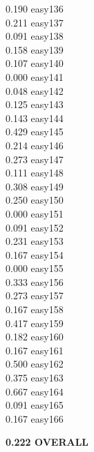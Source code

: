 \documentclass[10pt]{article}
\begin{document}
\begin{enumerate}
\begin{enumerate}
\begin{multicols}{5}
            0.190 easy136\\
            0.211 easy137\\
            0.091 easy138\\
            0.158 easy139\\
            0.107 easy140\\
            0.000 easy141\\
            0.048 easy142\\
            0.125 easy143\\
            0.143 easy144\\
            0.429 easy145\\
            0.214 easy146\\
            0.273 easy147\\
            0.111 easy148\\
            0.308 easy149\\
            0.250 easy150\\
            0.000 easy151\\
            0.091 easy152\\
            0.231 easy153\\
            0.167 easy154\\
            0.000 easy155\\
            0.333 easy156\\
            0.273 easy157\\
            0.167 easy158\\
            0.417 easy159\\
            0.182 easy160\\
            0.167 easy161\\
            0.500 easy162\\
            0.375 easy163\\
            0.667 easy164\\
            0.091 easy165\\
            0.167 easy166\\
            \end{multicols}
            \textbf{0.222 OVERALL}\\


\end{enumerate}
\end{enumerate}
\end{document}
